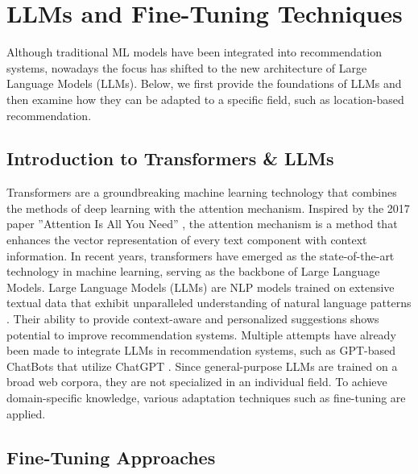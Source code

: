 \section{LLMs and Fine-Tuning Techniques}
\label{sec:lit_ft}

Although traditional ML models have been integrated into recommendation systems, nowadays the focus has shifted to the new architecture of Large Language Models (LLMs). Below, we first provide the foundations of LLMs and then examine how they can be adapted to a specific field, such as location-based recommendation.


\subsection{Introduction to Transformers \& LLMs}


Transformers are a groundbreaking machine learning technology that combines the methods of deep learning with the attention mechanism. Inspired by the 2017 paper ”Attention Is All You Need” \cite{attention_paper}, the attention mechanism is a method that enhances the vector representation of every text component with context information. In recent years, transformers have emerged as the state-of-the-art technology in machine learning, serving as the backbone of Large Language Models. Large Language Models (LLMs) are NLP models trained on extensive textual data that exhibit unparalleled
understanding of natural language patterns \cite{llm_recommend_systems}. Their ability to provide context-aware and personalized suggestions shows potential to improve recommendation systems. Multiple attempts have already been made to integrate LLMs in recommendation systems, such as GPT-based ChatBots that utilize ChatGPT \cite{gpt_chatbots}. Since general-purpose LLMs are trained on a broad web corpora, they are not specialized in an individual field. To achieve domain-specific knowledge, various adaptation techniques such as fine-tuning are applied. 


\subsection{Fine-Tuning Approaches}

